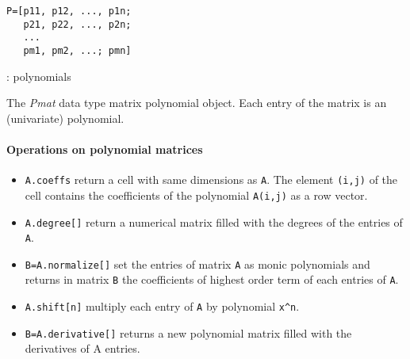 
\begin{mandesc}
\end{mandesc}
\begin{calling_sequence}
\begin{verbatim}
P=[p11, p12, ..., p1n;
   p21, p22, ..., p2n;
   ...
   pm1, pm2, ...; pmn]
\end{verbatim}
\end{calling_sequence}
\begin{parameters}
  \begin{varlist}
    : polynomials
  \end{varlist}
\end{parameters}

\begin{mandescription}
The \emph{Pmat} data type matrix polynomial object. 
Each entry of the matrix is an (univariate) polynomial.
\end{mandescription}

\paragraph{Operations on polynomial matrices}
\begin{itemize}
\item \verb+A.coeffs+ return a cell with same dimensions as \verb+A+. The element \verb+(i,j)+ of the cell 
  contains the coefficients of the polynomial \verb+A(i,j)+ as a row vector. 
\item \verb+A.degree[]+ return a numerical matrix filled with the degrees of the entries of \verb+A+.
\item \verb+B=A.normalize[]+ set the entries of matrix \verb+A+ as monic polynomials and returns in 
  matrix \verb+B+ the coefficients of highest order term of each entries of \verb+A+.
\item \verb+A.shift[n]+ multiply each entry of \verb+A+ by polynomial \verb+x^n+. 
\item \verb+B=A.derivative[]+ returns a new  polynomial matrix filled with the derivatives of A entries.
\end{itemize}

